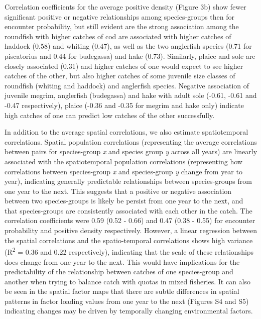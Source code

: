 \documentclass{nature}
\begin{document}
\begin{linenumbers}
Correlation coefficients for the average positive density (Figure 3b) show
fewer significant positive or negative relationships among species-groups then
for encounter probability, but still evident are the strong association among
the roundfish with higher catches of cod are associated with higher catches of
haddock (0.58) and whiting (0.47), as well as the two anglerfish species (0.71
for piscatorius and 0.44 for budegassa) and hake (0.73). Similarly, plaice and
sole are closely associated (0.31) and higher catches of one would expect to
see higher catches of the other, but also higher catches of some juvenile size
classes of roundfish (whiting and haddock) and anglerfish species. Negative
association of juvenile megrim, anglerfish (budegassa) and hake with adult sole
(-0.61, -0.61 and -0.47 respectively), plaice (-0.36 and -0.35 for megrim and
hake only) indicate high catches of one can predict low catches of the other
successfully.

In addition to the average spatial correlations, we also estimate
spatiotemporal correlations. Spatial population correlations (representing the
average correlations between pairs for species-group \textit{x} and species
group \textit{y} across all years) are linearly associated with the
spatiotemporal population correlations (representing how correlations between
species-group \textit{x} and species-group \textit{y} change from year to
year), indicating generally predictable relationships between species-groups
from one year to the next. This suggests that a positive or negative
association between two species-groups is likely be persist from one year to
the next, and that species-groups are consistently associated with each other
in the catch. The correlation coefficients were 0.59 (0.52 - 0.66) and 0.47
(0.38 - 0.55) for encounter probability and positive density respectively.
However, a linear regression between the spatial correlations and the
spatio-temporal correlations shows high variance (R\textsuperscript{2} = 0.36
and 0.22 respectively), indicating that the scale of these relationships does
change from one-year to the next. This would have implications for the
predictability of the relationship between catches of one species-group and
another when trying to balance catch with quotas in mixed fisheries. It can
also be seen in the spatial factor maps that there are subtle differences in
spatial patterns in factor loading values from one year to the next (Figures S4
and S5) indicating changes may be driven by temporally changing environmental
factors.



\end{linenumbers}
\end{document}

